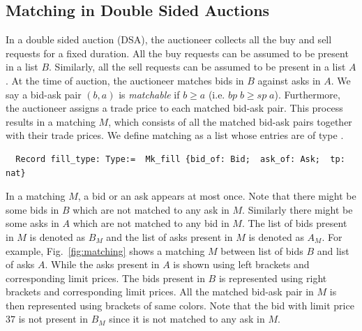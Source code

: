 \documentclass[a4paper,UKenglish,cleveref, autoref]{lipics-v2019}
\begin{document}
\subsection{Matching in Double Sided Auctions}
In a double sided auction (DSA), the auctioneer collects all the buy and sell requests for a fixed duration. All the buy requests can be assumed to be present in a list $B$. Similarly, all the sell requests can be assumed to be present in a list $A$. At the time of auction, the auctioneer matches bids in $B$ against asks in $A$. We say a bid-ask pair $(b, a)$ is \emph{matchable} if $b \ge a$ (i.e. $bp \; b \ge sp \; a$).  Furthermore, the auctioneer assigns a trade price to each matched bid-ask pair. This  process results in  a matching $M$, which consists of all the matched bid-ask pairs together with their trade prices. We define matching as a list whose entries are of type .
\begin{verbatim}
  Record fill_type: Type:=  Mk_fill {bid_of: Bid;  ask_of: Ask;  tp: nat} 
\end{verbatim}

In a matching $M$, a bid or an ask appears at most once. Note that there might be some bids in $B$ which are not matched to any ask in $M$. Similarly there might be some asks in $A$ which are not matched to any bid in $M$. The list of bids present in $M$ is denoted as $B_{M}$ and the list of asks present in $M$ is denoted as $A_M$. For example, Fig.~\ref{fig:matching} shows a matching $M$ between list of bids $B$ and list of asks $A$.  While the asks present in $A$ is shown using left brackets and corresponding limit prices. The bids present in $B$ is represented using right brackets and corresponding limit prices.  All the matched bid-ask pair in $M$ is then represented using  brackets of same colors. Note that the bid with limit price $37$ is not present in $B_M$ since it is not matched to any ask in $M$.  
\end{document}
